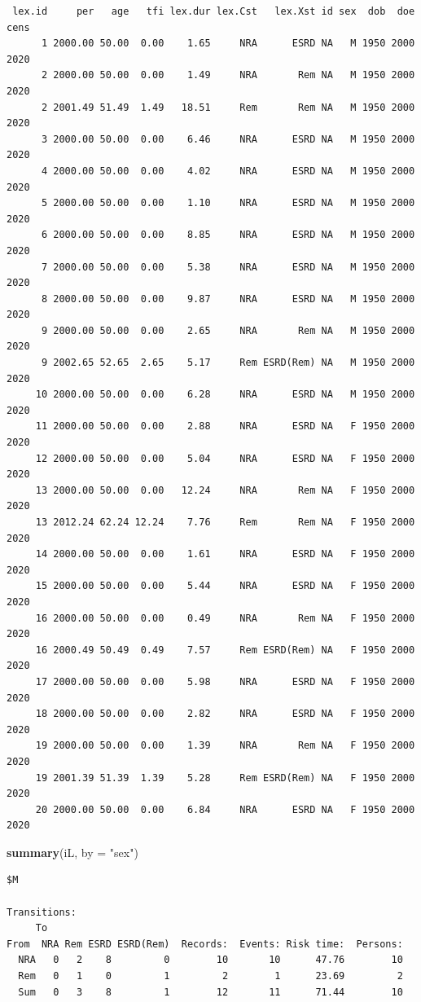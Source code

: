 \documentclass[
]{book}
\newenvironment{Shaded}{\begin{snugshade}}{\end{snugshade}}
\newcommand{\AttributeTok}[1]{\textcolor[rgb]{0.13,0.29,0.53}{#1}}
\newcommand{\FunctionTok}[1]{\textcolor[rgb]{0.13,0.29,0.53}{\textbf{#1}}}
\newcommand{\NormalTok}[1]{#1}
\newcommand{\StringTok}[1]{\textcolor[rgb]{0.31,0.60,0.02}{#1}}
\begin{document}
\begin{enumerate}
\begin{verbatim}
 lex.id     per   age   tfi lex.dur lex.Cst   lex.Xst id sex  dob  doe cens
      1 2000.00 50.00  0.00    1.65     NRA      ESRD NA   M 1950 2000 2020
      2 2000.00 50.00  0.00    1.49     NRA       Rem NA   M 1950 2000 2020
      2 2001.49 51.49  1.49   18.51     Rem       Rem NA   M 1950 2000 2020
      3 2000.00 50.00  0.00    6.46     NRA      ESRD NA   M 1950 2000 2020
      4 2000.00 50.00  0.00    4.02     NRA      ESRD NA   M 1950 2000 2020
      5 2000.00 50.00  0.00    1.10     NRA      ESRD NA   M 1950 2000 2020
      6 2000.00 50.00  0.00    8.85     NRA      ESRD NA   M 1950 2000 2020
      7 2000.00 50.00  0.00    5.38     NRA      ESRD NA   M 1950 2000 2020
      8 2000.00 50.00  0.00    9.87     NRA      ESRD NA   M 1950 2000 2020
      9 2000.00 50.00  0.00    2.65     NRA       Rem NA   M 1950 2000 2020
      9 2002.65 52.65  2.65    5.17     Rem ESRD(Rem) NA   M 1950 2000 2020
     10 2000.00 50.00  0.00    6.28     NRA      ESRD NA   M 1950 2000 2020
     11 2000.00 50.00  0.00    2.88     NRA      ESRD NA   F 1950 2000 2020
     12 2000.00 50.00  0.00    5.04     NRA      ESRD NA   F 1950 2000 2020
     13 2000.00 50.00  0.00   12.24     NRA       Rem NA   F 1950 2000 2020
     13 2012.24 62.24 12.24    7.76     Rem       Rem NA   F 1950 2000 2020
     14 2000.00 50.00  0.00    1.61     NRA      ESRD NA   F 1950 2000 2020
     15 2000.00 50.00  0.00    5.44     NRA      ESRD NA   F 1950 2000 2020
     16 2000.00 50.00  0.00    0.49     NRA       Rem NA   F 1950 2000 2020
     16 2000.49 50.49  0.49    7.57     Rem ESRD(Rem) NA   F 1950 2000 2020
     17 2000.00 50.00  0.00    5.98     NRA      ESRD NA   F 1950 2000 2020
     18 2000.00 50.00  0.00    2.82     NRA      ESRD NA   F 1950 2000 2020
     19 2000.00 50.00  0.00    1.39     NRA       Rem NA   F 1950 2000 2020
     19 2001.39 51.39  1.39    5.28     Rem ESRD(Rem) NA   F 1950 2000 2020
     20 2000.00 50.00  0.00    6.84     NRA      ESRD NA   F 1950 2000 2020
\end{verbatim}

\begin{Shaded}
\begin{Highlighting}[]
\FunctionTok{summary}\NormalTok{(iL, }\AttributeTok{by =} \StringTok{"sex"}\NormalTok{)}
\end{Highlighting}
\end{Shaded}

\begin{verbatim}
$M

Transitions:
     To
From  NRA Rem ESRD ESRD(Rem)  Records:  Events: Risk time:  Persons:
  NRA   0   2    8         0        10       10      47.76        10
  Rem   0   1    0         1         2        1      23.69         2
  Sum   0   3    8         1        12       11      71.44        10


\end{verbatim}
\end{enumerate}
\end{document}
